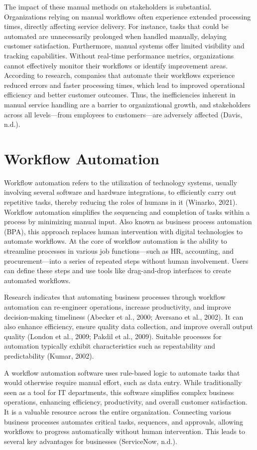 The impact of these manual methods on stakeholders is substantial. Organizations relying on manual workflows often experience extended processing times, directly affecting service delivery. For instance, tasks that could be automated are unnecessarily prolonged when handled manually, delaying customer satisfaction. Furthermore, manual systems offer limited visibility and tracking capabilities. Without real-time performance metrics, organizations cannot effectively monitor their workflows or identify improvement areas. According to research, companies that automate their workflows experience reduced errors and faster processing times, which lead to improved operational efficiency and better customer outcomes. Thus, the inefficiencies inherent in manual service handling are a barrier to organizational growth, and stakeholders across all levels—from employees to customers—are adversely affected (Davis, n.d.).

\section{Workflow Automation}

Workflow automation refers to the utilization of technology systems, usually involving several software and hardware integrations, to efficiently carry out repetitive tasks, thereby reducing the roles of humans in it (Winarko, 2021). Workflow automation simplifies the sequencing and completion of tasks within a process by minimizing manual input. Also known as business process automation (BPA), this approach replaces human intervention with digital technologies to automate workflows. At the core of workflow automation is the ability to streamline processes in various job functions—such as HR, accounting, and procurement—into a series of repeated steps without human involvement. Users can define these steps and use tools like drag-and-drop interfaces to create automated workflows. 

Research indicates that automating business processes through workflow automation can re-engineer operations, increase productivity, and improve decision-making timeliness (Abecker et al., 2000; Aversano et al., 2002). It can also enhance efficiency, ensure quality data collection, and improve overall output quality (London et al., 2009; Pakdil et al., 2009). Suitable processes for automation typically exhibit characteristics such as repeatability and predictability (Kumar, 2002). 

A workflow automation software uses rule-based logic to automate tasks that would otherwise require manual effort, such as data entry. While traditionally seen as a tool for IT departments, this software simplifies complex business operations, enhancing efficiency, productivity, and overall customer satisfaction. It is a valuable resource across the entire organization. Connecting various business processes automates critical tasks, sequences, and approvals, allowing workflows to progress automatically without human intervention. This leads to several key advantages for businesses (ServiceNow, n.d.).

